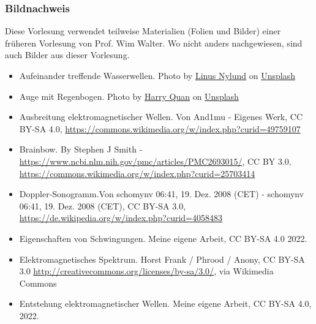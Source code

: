 \documentclass{beamer}
\begin{document}
\begin{frame}
\frametitle{Bildnachweis}
\begin{tiny}
Diese Vorlesung verwendet teilweise Materialien (Folien und Bilder) einer früheren Vorlesung von Prof. Wim Walter.  Wo nicht anders nachgewiesen, sind auch Bilder aus dieser Vorlesung. 
\end{tiny}

\vfill

\begin{tiny}
 
\begin{itemize}

\item
Aufeinander treffende Wasserwellen. Photo by \href{https://unsplash.com/@dreamsoftheoceans?utm_source=unsplash&utm_medium=referral&utm_content=creditCopyText}{Linus Nylund} on \href{https://unsplash.com/s/photos/water-ripples?utm_source=unsplash&utm_medium=referral&utm_content=creditCopyText}{Unsplash}
  
\item
Auge mit Regenbogen. Photo by \href{https://unsplash.com/@mango_quan?utm_source=unsplash&utm_medium=referral&utm_content=creditCopyText}{Harry Quan} on \href{https://unsplash.com/s/photos/prism?utm_source=unsplash&utm_medium=referral&utm_content=creditCopyText}{Unsplash}
  
\item
Ausbreitung elektromagnetischer Wellen. Von And1mu - Eigenes Werk, CC BY-SA 4.0, \url{https://commons.wikimedia.org/w/index.php?curid=49759107}

\item
Brainbow. By Stephen J Smith - \url{https://www.ncbi.nlm.nih.gov/pmc/articles/PMC2693015/}, CC BY 3.0, \url{https://commons.wikimedia.org/w/index.php?curid=25703414}

\item
Doppler-Sonogramm.Von schomynv 06:41, 19. Dez. 2008 (CET) - schomynv 06:41, 19. Dez. 2008 (CET), CC BY-SA 3.0, \url{https://de.wikipedia.org/w/index.php?curid=4058483}

\item
Eigenschaften von Schwingungen. Meine eigene Arbeit, CC BY-SA 4.0 2022.

\item
Elektromagnetisches Spektrum. Horst Frank / Phrood / Anony, CC BY-SA 3.0 \url{http://creativecommons.org/licenses/by-sa/3.0/}, via Wikimedia Commons

\item
Entstehung elektromagnetischer Wellen. Meine eigene Arbeit, CC BY-SA 4.0, 2022.


\end{itemize}
\end{tiny}
\end{frame}
\end{document}
